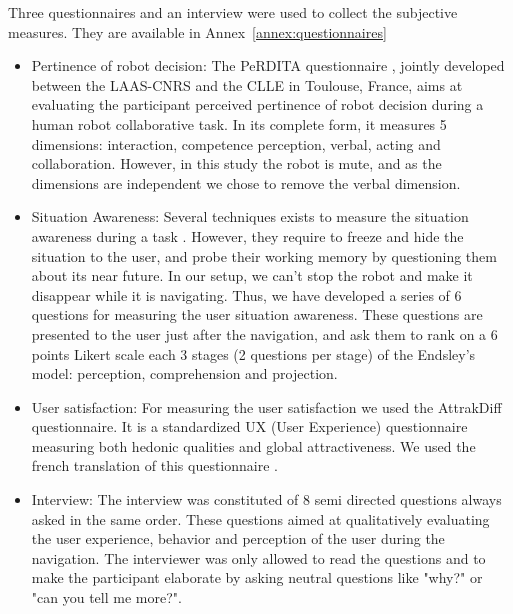 \documentclass[a4paper,11pt,twoside]{StyleThese}
\begin{document}
Three questionnaires and an interview were used to collect the subjective measures. They are available in Annex~\ref{annex:questionnaires}
\begin{itemize}
\item Pertinence of robot decision: The PeRDITA questionnaire \cite{devin_evaluating_2018}, jointly developed between the LAAS-CNRS and the CLLE in Toulouse, France, aims at evaluating the participant perceived pertinence of robot decision during a human robot collaborative task. In its complete form, it measures 5 dimensions: interaction, competence perception, verbal, acting and collaboration. However, in this study the robot is mute, and as the dimensions are independent we chose to remove the verbal dimension.
\item Situation Awareness: Several techniques exists to measure the situation awareness during a task \cite{endsley_design_1988}. However, they require to freeze and hide the situation to the user, and probe their working memory by questioning them about its near future. In our setup, we can't stop the robot and make it disappear while it is navigating. Thus, we have developed a series of 6 questions for measuring the user situation awareness. These questions are presented to the user just after the navigation, and ask them to rank on a 6 points Likert scale each 3 stages (2 questions per stage) of the Endsley's model: perception, comprehension and projection.
\item User satisfaction: For measuring the user satisfaction we used the AttrakDiff questionnaire. It is a standardized UX (User Experience) questionnaire measuring both hedonic qualities and global attractiveness. We used the french translation of this questionnaire \cite{lallemand_creation_2015}.
\item Interview: The interview was constituted of 8 semi directed questions always asked in the same order. These questions aimed at qualitatively evaluating the user experience, behavior and perception of the user during the navigation. The interviewer was only allowed to read the questions and to make the participant elaborate by asking neutral questions like "why?" or "can you tell me more?".
\end{itemize}
\end{document}
